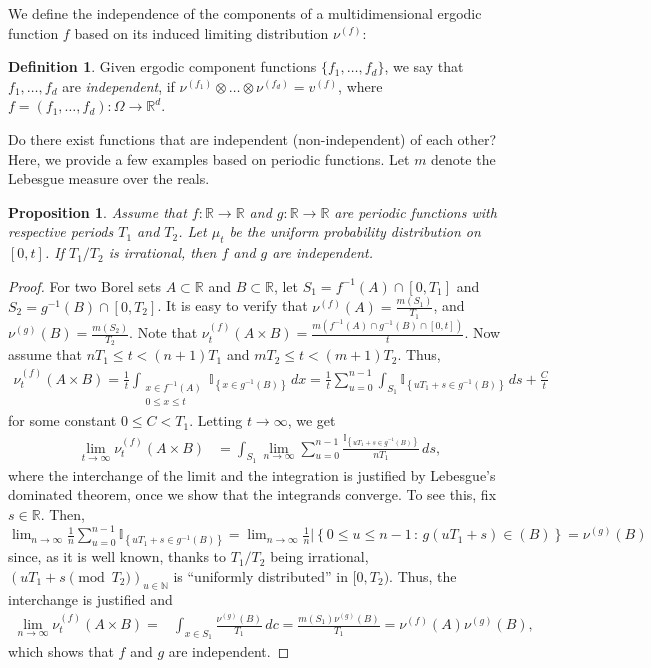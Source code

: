 \documentclass[english]{article} %
\newcommand{\todoc}[2][]{\todo[color=Apricot,#1]{#2}}
\newcommand{\cset}[2]{\left\{#1\,:\,#2\right\}}
\newcommand{\ind}[1]{\mathbb{I}_{\left\{ #1 \right\}}}
\newcommand{\ra}{\rightarrow}
\newcommand{\real}{\mathbb{R}}
\renewcommand{\natural}{\mathbb{N}}
\newtheorem{prop}[lemma]{Proposition}
\theoremstyle{definition}
\newtheorem{definition}[lemma]{Definition}
\begin{document}
We define the independence of the components of a multidimensional ergodic function $f$ based on its induced limiting distribution $\nu^{(f)}$:
\begin{definition}
Given ergodic component functions $\{f_1,\ldots,f_d\}$, 
we say that $f_1,\ldots,f_d$ are \emph{independent}, 
	if $\nu^{(f_1)}\otimes\ldots\otimes\nu^{(f_d)} = v^{(f)}$, 
	where $f = (f_1,\ldots,f_d):\Omega \rightarrow \real^d$.
\end{definition}

Do there exist functions that are independent (non-independent) of each other? 
Here, we provide a few examples based on periodic functions.
Let $m$ denote the Lebesgue measure over the reals.
\begin{prop}
Assume that $f:\real\rightarrow\real$ and $g:\real\rightarrow\real$ are periodic functions with respective periods $T_1$ and $T_2$. 
Let $\mu_t$ be the uniform probability distribution on $[0,t]$. 
 If $T_1/T_2$ is irrational, then $f$ and $g$ are independent. 
\end{prop}
\begin{proof}
 For two Borel sets $A\subset \real$ and $B\subset \real$, let $S_1 =f^{-1}(A)\cap [0,T_1] $ and $ S_2 = g^{-1}(B)\cap [0,T_2]$. It is easy to verify that $\nu^{(f)}(A) = \frac{m(S_1)}{T_1}$, and $\nu^{(g)}(B) = \frac{m(S_2)}{T_2}$. 
 Note that $\nu^{(f)}_t(A\times B) = \frac{m( f^{-1}(A)\cap g^{-1}(B)\cap [0,t] )}{t}$. Now assume that $nT_1 \le t< (n+1)T_1$ and $mT_2\le t <(m+1)T_2$. Thus,
 \begin{align*}
 \nu^{(f)}_t(A\times B) =  \frac{1}{t} \int_{ \substack{x\in f^{-1}(A) \\ 0\le x \le t}} \ind{x\in g^{-1}(B)}\, dx 
 					=	 \frac{1}{t} \sum_{u=0}^{n-1} \int_{S_1} \ind{uT_1+s \in g^{-1}(B)}\, ds + \frac{C}{t}
 \end{align*}
 for some constant $0\le C<T_1$. Letting $t\ra\infty$, we get
 \begin{align*}
  \lim_{t\rightarrow \infty} \nu^{(f)}_t(A\times B) 
  &=  \int_{S_1} \lim_{n\rightarrow \infty} \sum_{u=0}^{n-1} \frac{\ind{uT_1+s \in g^{-1}(B)}}{n T_1} \, ds,
 \end{align*}
 where the interchange of the limit and the integration is justified by Lebesgue's dominated theorem, once we show that the integrands converge.
To see this, fix $s\in \real$. Then,
 $\lim_{n\rightarrow \infty}\frac1n \sum_{u=0}^{n-1} \ind{uT_1+s \in g^{-1}(B)}
 =\lim_{n\rightarrow \infty}\frac1n | \cset{ 0\le u \le n-1 }{ g(uT_1+s) \in (B)}
 = \nu^{(g)}(B)$ since, as it is well known, thanks to $T_1/T_2$ being irrational, 
 $(u T_1+s \pmod T_2 )_{u\in \natural}$ is ``uniformly distributed'' in $[0,T_2)$.
 \todoc{We can cite P\'olya-Szeg\"o}
Thus, the interchange is justified and
 \begin{align*}
 \lim\limits_{n\rightarrow \infty} \nu^{(f)}_t(A\times B) = & \int_{x\in S_1} \frac{\nu^{(g)}(B)}{T_1}\, dc 
 														=  \frac{m(S_1)\nu^{(g)}(B)}{T_1} 
 														=  \nu^{(f)}(A)\nu^{(g)}(B),
 \end{align*}
which shows that  $f$ and $g$ are independent.
\end{proof}
\end{document}
